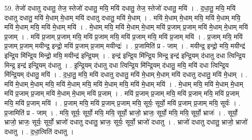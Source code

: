 \documentclass[17pt]{extarticle}
\begin{document}
59. तेजो॑ दधातु दधातु॒ तेज॒ स्तेजो॑ दधातु॒ मयि॒ मयि॑ दधातु॒ तेज॒ स्तेजो॑ दधातु॒ मयि॑ । . द॒धा॒तु॒ मयि॒ मयि॑ दधातु दधातु॒ मयि॑ मे॒धाम् मे॒धाम् मयि॑ दधातु दधातु॒ मयि॑ मे॒धाम् । . मयि॑ मे॒धाम् मे॒धाम् मयि॒ मयि॑ मे॒धाम् मयि॒ मयि॑ मे॒धाम् मयि॒ मयि॑ मे॒धाम् मयि॑ । . मे॒धाम् मयि॒ मयि॑ मे॒धाम् मे॒धाम् मयि॑ प्र॒जाम् प्र॒जाम् मयि॑ मे॒धाम् मे॒धाम् मयि॑ प्र॒जाम् । . मयि॑ प्र॒जाम् प्र॒जाम् मयि॒ मयि॑ प्र॒जाम् मयि॒ मयि॑ प्र॒जाम् मयि॒ मयि॑ प्र॒जाम् मयि॑ । . प्र॒जाम् मयि॒ मयि॑ प्र॒जाम् प्र॒जाम् मयीन्द्र॒ इन्द्रो॒ मयि॑ प्र॒जाम् प्र॒जाम् मयीन्द्रः॑ । . प्र॒जामिति॑ प्र - जाम् । . मयीन्द्र॒ इन्द्रो॒ मयि॒ मयीन्द्र॑ इन्द्रि॒य मि॑न्द्रि॒य मिन्द्रो॒ मयि॒ मयीन्द्र॑ इन्द्रि॒यम् । . इन्द्र॑ इन्द्रि॒य मि॑न्द्रि॒य मिन्द्र॒ इन्द्र॑ इन्द्रि॒यम् द॑धातु दधा त्विन्द्रि॒य मिन्द्र॒ इन्द्र॑ इन्द्रि॒यम् द॑धातु । . इ॒न्द्रि॒यम् द॑धातु दधा त्विन्द्रि॒य मि॑न्द्रि॒यम् द॑धातु॒ मयि॒ मयि॑ दधा त्विन्द्रि॒य मि॑न्द्रि॒यम् द॑धातु॒ मयि॑ । . द॒धा॒तु॒ मयि॒ मयि॑ दधातु दधातु॒ मयि॑ मे॒धाम् मे॒धाम् मयि॑ दधातु दधातु॒ मयि॑ मे॒धाम् । . मयि॑ मे॒धाम् मे॒धाम् मयि॒ मयि॑ मे॒धाम् मयि॒ मयि॑ मे॒धाम् मयि॒ मयि॑ मे॒धाम् मयि॑ । . मे॒धाम् मयि॒ मयि॑ मे॒धाम् मे॒धाम् मयि॑ प्र॒जाम् प्र॒जाम् मयि॑ मे॒धाम् मे॒धाम् मयि॑ प्र॒जाम् । . मयि॑ प्र॒जाम् प्र॒जाम् मयि॒ मयि॑ प्र॒जाम् मयि॒ मयि॑ प्र॒जाम् मयि॒ मयि॑ प्र॒जाम् मयि॑ । . प्र॒जाम् मयि॒ मयि॑ प्र॒जाम् प्र॒जाम् मयि॒ सूर्यः॒ सूर्यो॒ मयि॑ प्र॒जाम् प्र॒जाम् मयि॒ सूर्यः॑ । . प्र॒जामिति॑ प्र - जाम् । . मयि॒ सूर्यः॒ सूर्यो॒ मयि॒ मयि॒ सूर्यो॒ भ्राजो॒ भ्राजः॒ सूर्यो॒ मयि॒ मयि॒ सूर्यो॒ भ्राजः॑ । . सूर्यो॒ भ्राजो॒ भ्राजः॒ सूर्यः॒ सूर्यो॒ भ्राजो॑ दधातु दधातु॒ भ्राजः॒ सूर्यः॒ सूर्यो॒ भ्राजो॑ दधातु । . भ्राजो॑ दधातु दधातु॒ भ्राजो॒ भ्राजो॑ दधातु । . द॒धा॒त्विति॑ दधातु । \newline
\pagebreak
{}
\end{document}
